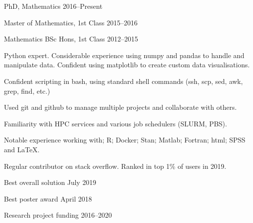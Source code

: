 \documentclass[12pt, a4paper]{article}
\begin{document}


\printdetails




%
        {PhD, Mathematics}%
        {2016--Present}

%
        {Master of Mathematics, 1st Class}%
        {2015--2016}

%
        {Mathematics BSc Hons, 1st Class}%
        {2012--2015}



%
         {Python expert. Considerable experience using numpy and pandas to handle and
         manipulate data. Confident using matplotlib to create custom data
         visualisations.}

%
         {Confident scripting in bash, using standard shell commands (ssh, scp, sed, awk,
         grep, find, etc.)}

%
         {Used git and github to manage multiple projects and collaborate with others.}

%
         {Familiarity with HPC services and various job schedulers (SLURM, PBS).}

%
         {Notable experience working with; R; Docker; Stan; Matlab; Fortran; html; SPSS
         and \LaTeX{}.}

%
         {Regular contributor on stack overflow. Ranked in top 1\% of users in 2019.}



%
        {Best overall solution}%
        {July 2019}

%
        {Best poster award}%
        {April 2018}

%
        {Research project funding}%
        {2016--2020}


\end{document}
